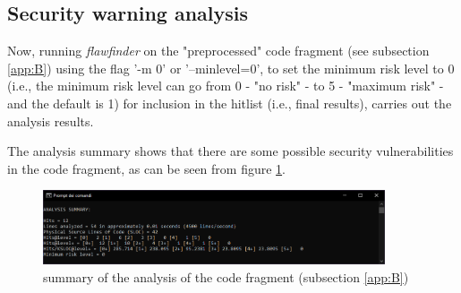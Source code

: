 \subsection{Security warning analysis}
Now, running \textit{flawfinder} on the "preprocessed" code fragment (see subsection \ref{app:B}) using the flag '-m 0' or '--minlevel=0', to set the minimum risk level to 0 (i.e., the minimum risk level can go from 0 - "no risk" - to 5 - "maximum risk" - and the default is 1) for inclusion in the hitlist (i.e., final results), carries out the analysis results.

The analysis summary shows that there are some possible security vulnerabilities in the code fragment, as can be seen from figure \ref{fig:analysis_summary}.

\begin{figure}[H]
    \centering
    \includegraphics[width=0.9\textwidth]{Resources/analysis_summary.PNG}
    \caption{summary of the analysis of the code fragment (subsection \ref{app:B})}
    \label{fig:analysis_summary}
\end{figure}

